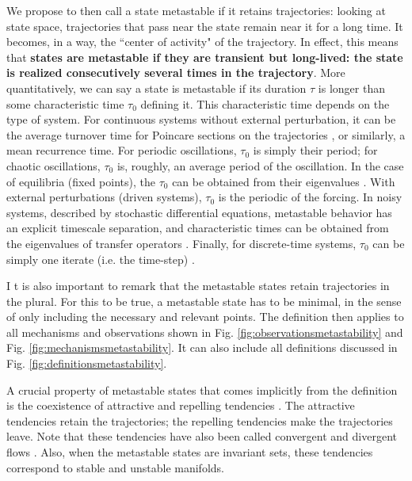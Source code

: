 \documentclass[reprint,onecolumn,superscriptaddress,showpacs,amsmath,amssymb,aps,floatfix]{revtex4-2}
\theoremstyle{definition}
\newcommand{\Emph}[1]{\textbf{#1}}
\begin{document}
We propose to then call a state metastable if it retains trajectories: looking at state space, trajectories that pass near the state remain near it for a long time. It becomes, in a way, the ``center of activity" of the trajectory. In effect, this means that \Emph{states are metastable if they are transient but long-lived: the state is realized consecutively several times in the trajectory}. More quantitatively, we can say a state is metastable if its duration $\tau$ is longer than some characteristic time $\tau_0$ defining it.
This characteristic time depends on the type of system. For continuous systems without external perturbation, it can be the average turnover time for Poincare sections on the trajectories \cite{lai2009transient}, or similarly, a mean recurrence time. For periodic oscillations, $\tau_0$ is simply their period; for chaotic oscillations, $\tau_0$ is, roughly, an average period of the oscillation. In the case of equilibria (fixed points), the $\tau_0$ can be obtained from their eigenvalues \cite{strogatz2002nonlinear}. With external perturbations (driven systems), $\tau_0$ is the periodic of the forcing. In noisy systems, described by stochastic differential equations, metastable behavior has an explicit timescale separation, and characteristic times can be obtained from the eigenvalues of transfer operators \cite{bittracher2018transition, bittracher2021dimensionality}. Finally, for discrete-time systems, $\tau_0$ can be simply one iterate (i.e. the time-step) \cite{lai2009transient}. 

I   t is also important to remark that the metastable states retain trajectories in the plural. For this to be true, a metastable state has to be minimal, in the sense of only including the necessary and relevant points. The definition then applies to all mechanisms and observations shown in Fig. \ref{fig:observationsmetastability} and Fig. \ref{fig:mechanismsmetastability}. It can also include all definitions discussed in Fig. \ref{fig:definitionsmetastability}.

A crucial property of metastable states that comes implicitly from the definition is the coexistence of attractive and repelling tendencies \cite{tognoli2014metastable}. The attractive tendencies retain the trajectories; the repelling tendencies make the trajectories leave. Note that these tendencies have also been called convergent and divergent flows \cite{kaneko2003chaotic}. Also, when the metastable states are invariant sets, these tendencies correspond to stable and unstable manifolds. 
\end{document}
